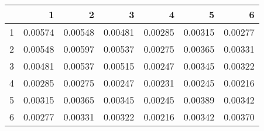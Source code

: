 \begin{table}[ht]
\begin{center}
\begin{tabular}{rrrrrrr}
  \hline
 & 1 & 2 & 3 & 4 & 5 & 6 \\ 
  \hline
1 & 0.00574 & 0.00548 & 0.00481 & 0.00285 & 0.00315 & 0.00277 \\ 
  2 & 0.00548 & 0.00597 & 0.00537 & 0.00275 & 0.00365 & 0.00331 \\ 
  3 & 0.00481 & 0.00537 & 0.00515 & 0.00247 & 0.00345 & 0.00322 \\ 
  4 & 0.00285 & 0.00275 & 0.00247 & 0.00231 & 0.00245 & 0.00216 \\ 
  5 & 0.00315 & 0.00365 & 0.00345 & 0.00245 & 0.00389 & 0.00342 \\ 
  6 & 0.00277 & 0.00331 & 0.00322 & 0.00216 & 0.00342 & 0.00370 \\ 
   \hline
\end{tabular}
\end{center}
\end{table}
